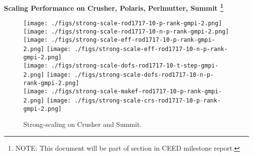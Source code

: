 

\medskip
\begin{center}
{\large\bf Scaling Performance on Crusher, Polaris, Perlmutter, Summit 
 \footnote{NOTE: This document will be part of section in CEED milestone report.}}
\end{center}

\medskip
\medskip




\begin{figure*}[t]
  \begin{center}
     \texttt{[image: ./figs/strong-scale-rod1717-10-p-rank-gmpi-2.png]}
     \texttt{[image: ./figs/strong-scale-rod1717-10-n-p-rank-gmpi-2.png]}
     \\
     \texttt{[image: ./figs/strong-scale-eff-rod1717-10-p-rank-gmpi-2.png]}
     \texttt{[image: ./figs/strong-scale-eff-rod1717-10-n-p-rank-gmpi-2.png]}
     \\
     \texttt{[image: ./figs/strong-scale-dofs-rod1717-10-t-step-gmpi-2.png]}
     \texttt{[image: ./figs/strong-scale-dofs-rod1717-10-n-p-rank-gmpi-2.png]}
     \\
     \texttt{[image: ./figs/strong-scale-makef-rod1717-10-p-rank-gmpi-2.png]}
     \texttt{[image: ./figs/strong-scale-crs-rod1717-10-p-rank-gmpi-2.png]}
   \caption{\label{perf170}Strong-scaling on Crusher and Summit.}
  \end{center}
\end{figure*}



